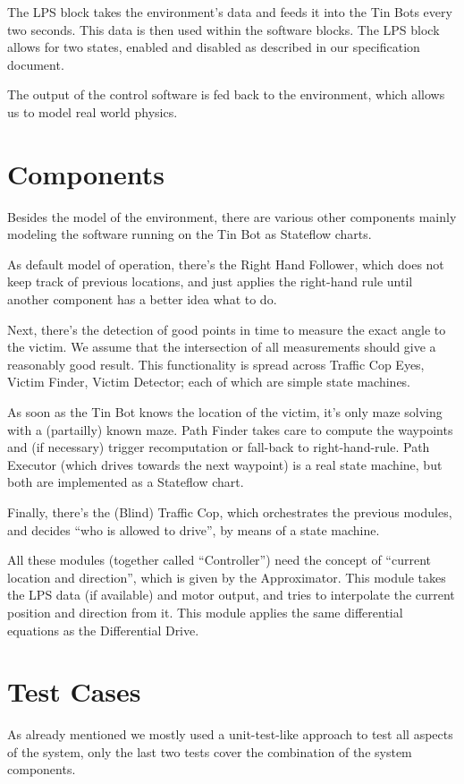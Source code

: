 \documentclass[a4paper,parskip,headheight=38pt]{scrartcl} %
\begin{document}
The LPS block takes the environment's data and feeds it into the Tin Bots every two seconds. This data is then used within the software blocks. The LPS block allows for two states, enabled and disabled as described in our specification document.

The output of the control software is fed back to the environment, which allows us to model real world physics.

\section{Components}
Besides the model of the environment, there are various other components mainly modeling the software running on the Tin Bot as Stateflow charts.

As default model of operation, there's the Right Hand Follower, which does not keep track of previous locations, and just applies the right-hand rule until another component has a better idea what to do.

Next, there's the detection of good points in time to measure the exact angle to the victim.  We assume that the intersection of all measurements should give a reasonably good result.  This functionality is spread across Traffic Cop Eyes, Victim Finder, Victim Detector; each of which are simple state machines.

As soon as the Tin Bot knows the location of the victim, it's only maze solving with a (partailly) known maze.  Path Finder takes care to compute the waypoints and (if necessary) trigger recomputation or fall-back to right-hand-rule.  Path Executor (which drives towards the next waypoint) is a real state machine, but both are implemented as a Stateflow chart.

Finally, there's the (Blind) Traffic Cop, which orchestrates the previous modules, and decides \enquote{who is allowed to drive}, by means of a state machine.

All these modules (together called \enquote{Controller}) need the concept of \enquote{current location and direction}, which is given by the Approximator.  This module takes the LPS data (if available) and motor output, and tries to interpolate the current position and direction from it.  This module applies the same differential equations as the Differential Drive.

\section{Test Cases}
As already mentioned we mostly used a unit-test-like approach to test all aspects of the system, only the last two tests cover the combination of the system components.
\end{document}
